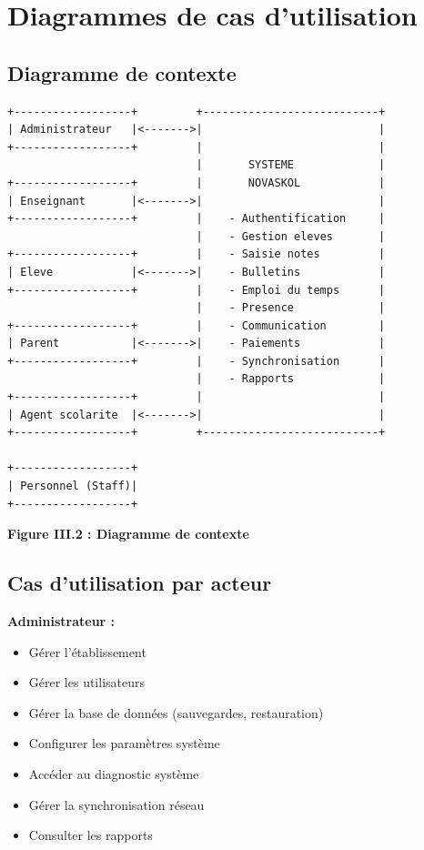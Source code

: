 \documentclass[12pt,a4paper,twoside]{report}
\begin{document}
\section{Diagrammes de cas d'utilisation}

\subsection{Diagramme de contexte}

\begin{verbatim}
+------------------+         +---------------------------+
| Administrateur   |<------->|                           |
+------------------+         |                           |
                             |       SYSTEME             |
+------------------+         |       NOVASKOL            |
| Enseignant       |<------->|                           |
+------------------+         |    - Authentification     |
                             |    - Gestion eleves       |
+------------------+         |    - Saisie notes         |
| Eleve            |<------->|    - Bulletins            |
+------------------+         |    - Emploi du temps      |
                             |    - Presence             |
+------------------+         |    - Communication        |
| Parent           |<------->|    - Paiements            |
+------------------+         |    - Synchronisation      |
                             |    - Rapports             |
+------------------+         |                           |
| Agent scolarite  |<------->|                           |
+------------------+         +---------------------------+

+------------------+
| Personnel (Staff)|
+------------------+
\end{verbatim}

\begin{center}
\textbf{Figure III.2 : Diagramme de contexte}
\end{center}

\subsection{Cas d'utilisation par acteur}

\textbf{Administrateur :}
\begin{itemize}
    \item Gérer l'établissement
    \item Gérer les utilisateurs
    \item Gérer la base de données (sauvegardes, restauration)
    \item Configurer les paramètres système
    \item Accéder au diagnostic système
    \item Gérer la synchronisation réseau
    \item Consulter les rapports
\end{itemize}
\end{document}
